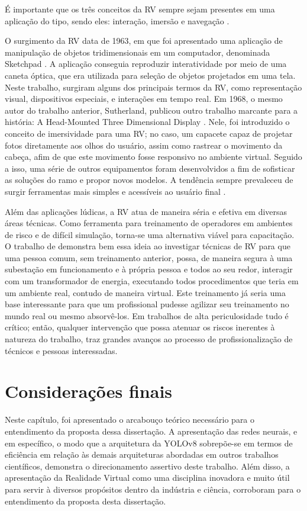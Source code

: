 É importante que os três conceitos da RV sempre sejam presentes em uma aplicação do tipo, sendo eles: interação, imersão e navegação \cite{kalawsky1993science}.

O surgimento da RV data de 1963, em que foi apresentado uma aplicação de manipulação de objetos tridimensionais em um computador, denominada Sketchpad \cite {sutherland1963sketchpad}. A aplicação conseguia reproduzir interatividade por meio de uma caneta óptica, que era utilizada para seleção de objetos projetados em uma tela. Neste trabalho, surgiram alguns dos principais termos da RV, como representação visual, dispositivos especiais, e interações em tempo real. Em 1968, o mesmo autor do trabalho anterior, Sutherland, publicou outro trabalho marcante para a história: A Head-Mounted Three Dimensional Display \cite{sutherland1968head}. Nele, foi introduzido o conceito de imersividade para uma RV; no caso, um capacete capaz de projetar fotos diretamente aos olhos do usuário, assim como rastrear o movimento da cabeça, afim de que este movimento fosse responsivo no ambiente virtual. Seguido a isso, uma série de outros equipamentos foram desenvolvidos a fim de sofisticar as soluções do ramo e propor novos modelos. A tendência sempre prevaleceu de surgir ferramentas mais simples e acessíveis ao usuário final \cite{kirner2011evoluccao}.

Além das aplicações lúdicas, a RV atua de maneira séria e efetiva em diversas áreas técnicas. Como ferramenta para treinamento de operadores em ambientes de risco e de difícil simulação, torna-se uma alternativa viável para capacitação.  O trabalho de \cite{silva2012virtual} demonstra bem essa ideia ao investigar técnicas de RV para que uma pessoa comum, sem treinamento anterior, possa, de maneira segura à uma subestação em funcionamento e à própria pessoa e todos ao seu redor, interagir com um transformador de energia, executando todos procedimentos que teria em um ambiente real, contudo de maneira virtual. Este treinamento já seria uma base interessante para que um profissional pudesse agilizar seu treinamento no mundo real ou mesmo absorvê-los. Em trabalhos de alta periculosidade tudo é crítico; então, qualquer intervenção que possa atenuar os riscos inerentes à natureza do trabalho, traz grandes avanços ao processo de profissionalização de técnicos e pessoas interessadas. 



\section{Considerações finais}

Neste capítulo, foi apresentado o arcabouço teórico necessário para o entendimento da proposta dessa dissertação. A apresentação das redes neurais, e em específico, o modo que a arquitetura da YOLOv8 sobrepõe-se em termos de eficiência em relação às demais arquiteturas abordadas em outros trabalhos científicos, demonstra o direcionamento assertivo deste trabalho. Além disso, a apresentação da Realidade Virtual como uma disciplina inovadora e muito útil para servir à diversos propósitos dentro da indústria e ciência, corroboram para o entendimento da proposta desta dissertação.